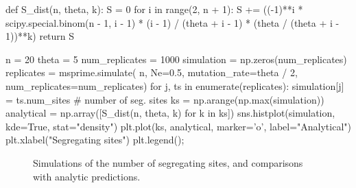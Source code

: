 \documentclass[graybox]{svmult}
\begin{document}
\begin{pythoncode}
def S_dist(n, theta, k):
    S = 0
    for i in range(2, n + 1):
        S += ((-1)**i * scipy.special.binom(n - 1, i - 1)
              * (i - 1) / (theta + i - 1)
              * (theta / (theta + i - 1))**k)
    return S

n = 20
theta = 5
num_replicates = 1000
simulation = np.zeros(num_replicates)
replicates = msprime.simulate(
    n, Ne=0.5, mutation_rate=theta / 2, num_replicates=num_replicates)
for j, ts in enumerate(replicates):
    simulation[j] = ts.num_sites  # number of seg. sites
ks = np.arange(np.max(simulation))
analytical = np.array([S_dist(n, theta, k) for k in ks])
sns.histplot(simulation, kde=True,
    stat="density")
plt.plot(ks, analytical, marker='o', label="Analytical")
plt.xlabel("Segregating sites")
plt.legend();
\end{pythoncode}

\begin{figure}[t]
\centering
{}
\qquad\qquad
{}
\caption{\label{fig-segsites}
Simulations of the number of segregating sites, and
comparisons with analytic predictions.
}
\end{figure}
\end{document}
